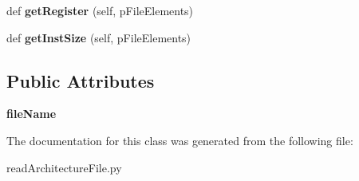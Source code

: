 \begin{DoxyCompactItemize}
\item 
def {\bfseries get\+Register} (self, p\+File\+Elements)\hypertarget{classreadArchitectureFile_1_1Reader_ab10aa55f685ddf7df4b6a93c212e96d8}{}\label{classreadArchitectureFile_1_1Reader_ab10aa55f685ddf7df4b6a93c212e96d8}

\item 
def {\bfseries get\+Inst\+Size} (self, p\+File\+Elements)\hypertarget{classreadArchitectureFile_1_1Reader_acafe97f092d76aafdb5c3b0ee080b6cc}{}\label{classreadArchitectureFile_1_1Reader_acafe97f092d76aafdb5c3b0ee080b6cc}

\end{DoxyCompactItemize}
\subsection*{Public Attributes}
\begin{DoxyCompactItemize}
\item 
{\bfseries file\+Name}\hypertarget{classreadArchitectureFile_1_1Reader_a2738aa7b15504ff6cb7d11b56a1a3720}{}\label{classreadArchitectureFile_1_1Reader_a2738aa7b15504ff6cb7d11b56a1a3720}

\end{DoxyCompactItemize}


The documentation for this class was generated from the following file\+:\begin{DoxyCompactItemize}
\item 
read\+Architecture\+File.\+py\end{DoxyCompactItemize}
